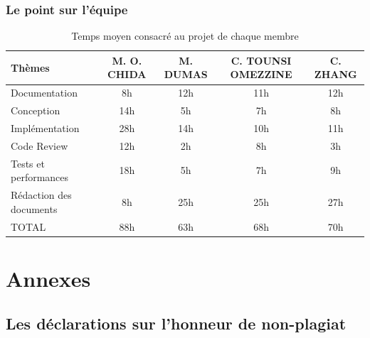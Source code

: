 \documentclass[12pt]{article}
\begin{document}
        \subsubsection*{Le point sur l'équipe}
        \begin{table}[!h]
            \begin{center}
                \begin{tabular}{|l|c|c|c|c|}
                    \hline
                    Thèmes & M. O. CHIDA & M. DUMAS & C. TOUNSI OMEZZINE & C. ZHANG \\
                    \hline
                    Documentation & 8h & 12h & 11h & 12h \\
                    Conception & 14h & 5h & 7h & 8h \\
                    Implémentation & 28h & 14h & 10h & 11h \\
                    Code Review & 12h & 2h & 8h & 3h \\
                    Tests et performances & 18h & 5h & 7h & 9h \\
                    Rédaction des documents & 8h & 25h & 25h & 27h \\
                    \hline
                    TOTAL & 88h & 63h & 68h & 70h \\
                    \hline
                \end{tabular}
            \end{center}
            \caption{Temps moyen consacré au projet de chaque membre}
            \label{tab:times}
        \end{table}

\newpage

\section*{Annexes}
    
    
    \subsection*{Les déclarations sur l'honneur de non-plagiat}
    
    \newpage
    
    \newpage
    
    \newpage
     
    \newpage
    
\end{document}
